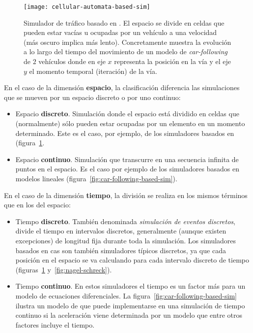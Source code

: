 \begin{figure}
	\centering
	\texttt{[image: cellular-automata-based-sim]}
	\caption[Ejemplo de simulador basado en ]{Simulador de tráfico basado en . El espacio se divide en celdas que pueden estar vacías u ocupadas por un vehículo a una velocidad (más oscuro implica más lento). Concretamente muestra la evolución a lo largo del tiempo del movimiento de un modelo de \textit{car-following} de $2$ vehículos donde en eje $x$ representa la posición en la vía y el eje $y$ el momento temporal (iteración) de la vía.}
	\label{fig:cellular-automata-based-sim}
\end{figure}

En el caso de la dimensión \textbf{espacio}, la clasificación diferencia las simulaciones que se mueven por un espacio discreto o por uno continuo:

\begin{itemize}
	\item Espacio \textbf{discreto}. Simulación donde el espacio está dividido en celdas que (normalmente) sólo pueden estar ocupadas por un elemento en un momento determinado. Este es el caso, por ejemplo, de los simuladores basados en  (figura~\ref{fig:cellular-automata-based-sim}.
	\item Espacio \textbf{continuo}. Simulación que transcurre en una secuencia infinita de puntos en el espacio. Es el caso por ejemplo de los simuladores basados en modelos lineales (figura~\ref{fig:car-following-based-sim}).
\end{itemize}

En el caso de la dimensión \textbf{tiempo}, la división se realiza en los mismos términos que en los del espacio:

\begin{itemize}
	\item Tiempo \textbf{discreto}. También denominada \textit{simulación de eventos discretos}, divide el tiempo en intervalos discretos, generalmente (aunque existen excepciones) de longitud fija durante toda la simulación. Los simuladores basados en \acp{ca} son también simuladores típicos discretos, ya que cada posición en el espacio se va calculando para cada intervalo discreto de tiempo (figuras~\ref{fig:cellular-automata-based-sim} y~\ref{fig:nagel-schreck}).
	\item Tiempo \textbf{continuo}. En estos simuladores el tiempo es un factor más para un modelo de ecuaciones diferenciales. La figura~\ref{fig:car-following-based-sim} ilustra un modelo de \textit{} que puede implementarse en una simulación de tiempo continuo si la aceleración viene determinada por un modelo que entre otros factores incluye el tiempo.
\end{itemize}

